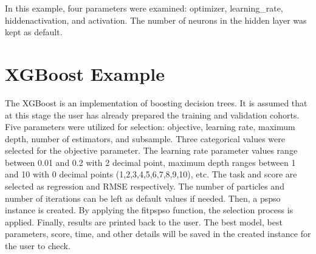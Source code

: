\documentclass[letterpaper,10pt,english]{sphinxmanual}
\begin{document}
In this example, four parameters were examined: optimizer,
learning\_rate, hiddenactivation, and activation. The number of neurons
in the hidden layer was kept as default.


\section{XGBoost Example}
\label{\detokenize{index:xgboost-example}}
The XGBoost is an implementation of boosting decision trees.
It is assumed that at this stage the user has already prepared the training and validation cohorts.
Five parameters were utilized for selection: objective, learning rate, maximum depth, number of estimators, and subsample.
Three categorical values were selected for the objective parameter.
The learning rate parameter values range between 0.01 and 0.2 with 2 decimal point,
maximum depth ranges between 1 and 10 with 0 decimal points (1,2,3,4,5,6,7,8,9,10), etc.
The task and score are selected as regression and RMSE respectively.
The number of particles and number of iterations can be left as default values if needed.
Then, a pspso instance is created. By applying the fitpspso function, the selection process is applied.
Finally, results are printed back to the user.
The best model, best parameters, score, time, and other details will be saved in the created instance for the user to check.
\end{document}
